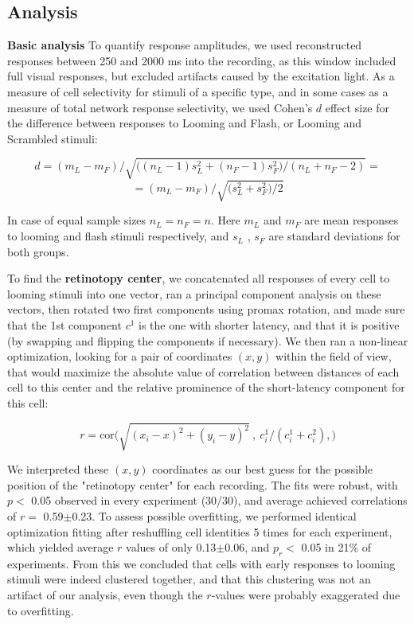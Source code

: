 \documentclass{article}
\begin{document}
\subsection*{Analysis}

\textbf{Basic analysis} To quantify response amplitudes, we used reconstructed responses between 250 and 2000 ms into the recording, as this window included full visual responses, but excluded artifacts caused by the excitation light. As a measure of cell selectivity for stimuli of a specific type, and in some cases as a measure of total network response selectivity, we used Cohen’s $d$ effect size for the difference between responses to Looming and Flash, or Looming and Scrambled stimuli:

\[ d = (m_L-m_F)/ \sqrt{ \big((n_L-1) s^2_L + (n_F-1) s^2_F)/(n_L + n_F - 2)} = \]
\[ =(m_L-m_F)/\sqrt{\big(s^2_L+s^2_F\big)/2} \]

In case of equal sample sizes $n_L=n_F=n$. Here $m_L$ and $m_F$ are mean responses to looming and flash stimuli respectively, and $s_L$ , $s_F$ are standard deviations for both groups.

To find the \textbf{retinotopy center}, we concatenated all responses of every cell to looming stimuli into one vector, ran a principal component analysis on these vectors, then rotated two first components using promax rotation, and made sure that the 1st component $c^1$ is the one with shorter latency, and that it is positive (by swapping and flipping the components if necessary). We then ran a non-linear optimization, looking for a pair of coordinates $(x,y)$ within the field of view, that would maximize the absolute value of correlation between distances of each cell to this center and the relative prominence of the short-latency component for this cell:

\[ r = \text{cor}\big(\sqrt{(x_i-x)^2+(y_i-y)^2}\ ,\ c^1_i/(c^1_i + c^2_i), \big) \]

We interpreted these $(x,y)$ coordinates as our best guess for the possible position of the "retinotopy center" for each recording. The fits were robust, with $p<$ 0.05 observed in every experiment (30/30), and average achieved correlations of $r=$ 0.59$\pm$0.23. To assess possible overfitting, we performed identical optimization fitting  after reshuffling cell identities 5 times for each experiment, which yielded average $r$ values of only 0.13$\pm$0.06, and $p_r<$ 0.05 in 21\% of experiments. From this we concluded that cells with early responses to looming stimuli were indeed clustered together, and that this clustering was not an artifact of our analysis, even though the $r$-values were probably exaggerated due to overfitting.
\end{document}

